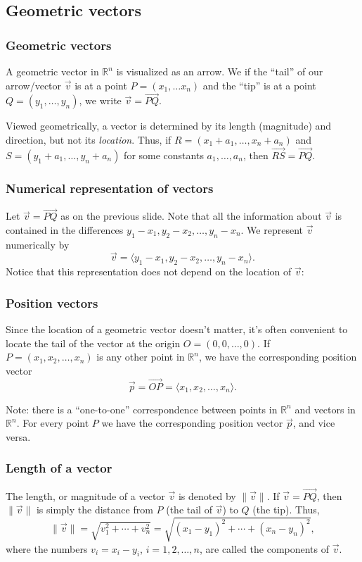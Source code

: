 \documentclass[11pt,t]{beamer}
\newcommand{\R}{\mathbb{R}}
\newcommand{\len}[1]{\lVert #1\rVert}
\begin{document}
\subsection{Geometric vectors}
\begin{frame}
\frametitle{Geometric vectors}

A \alert{geometric vector} in $\R^n$ is visualized as an arrow. We if the ``tail'' of our arrow/vector $\vec{v}$ is at a point $P=(x_1,\ldots x_n)$ and the ``tip'' is at a point $Q=(y_1,\ldots, y_n)$, we write $\vec{v}=\overrightarrow{PQ}$.

Viewed geometrically, a vector is determined by its \alert{length} (\alert{magnitude}) and \alert{direction}, but not its {\em location}. Thus, if $R=(x_1+a_1,\ldots, x_n+a_n)$ and $S=(y_1+a_1,\ldots, y_n+a_n)$ for some constants $a_1,\ldots, a_n$, then $\overrightarrow{RS}=\overrightarrow{PQ}$.

\begin{example}

\end{example}
\end{frame}
\begin{frame}
\frametitle{Numerical representation of vectors}

Let $\vec{v}=\overrightarrow{PQ}$ as on the previous slide. Note that all the information about $\vec{v}$ is contained in the differences $y_1-x_1,y_2-x_2,\ldots,y_n-x_n$. We represent $\vec{v}$ numerically by
\[
\vec{v} = \langle y_1-x_1,y_2-x_2,\ldots,y_n-x_n\rangle.
\]
Notice that this representation does not depend on the location of $\vec{v}$:
\end{frame}
\begin{frame}
\frametitle{Position vectors}

Since the location of a geometric vector doesn't matter, it's often convenient to locate the tail of the vector at the origin $O=(0,0,\ldots, 0)$. If $P=(x_1,x_2,\ldots, x_n)$ is any other point in $\R^n$, we have the corresponding \alert{position vector}
\[
\vec{p} = \overrightarrow{OP} = \langle x_1,x_2,\ldots, x_n\rangle.
\]

Note: there is a ``one-to-one'' correspondence between points in $\R^n$ and vectors in $\R^n$. For every point $P$ we have the corresponding position vector $\vec{p}$, and vice versa.
\end{frame}
\begin{frame}
\frametitle{Length of a vector}

The \alert{length}, or \alert{magnitude} of a vector $\vec{v}$ is denoted by $\len{\vec{v}}$. If $\vec{v}=\overrightarrow{PQ}$, then $\len{\vec{v}}$ is simply the distance from $P$ (the tail of $\vec{v}$) to $Q$ (the tip). Thus,
\[
\len{\vec{v}} = \sqrt{v_1^2+\cdots +v_n^2}=\sqrt{(x_1-y_1)^2+\cdots+(x_n-y_n)^2},
\]
where the numbers $v_i = x_i-y_i$, $i=1,2,\ldots, n$, are called the \alert{components} of $\vec{v}$.
\end{frame}
\end{document}

